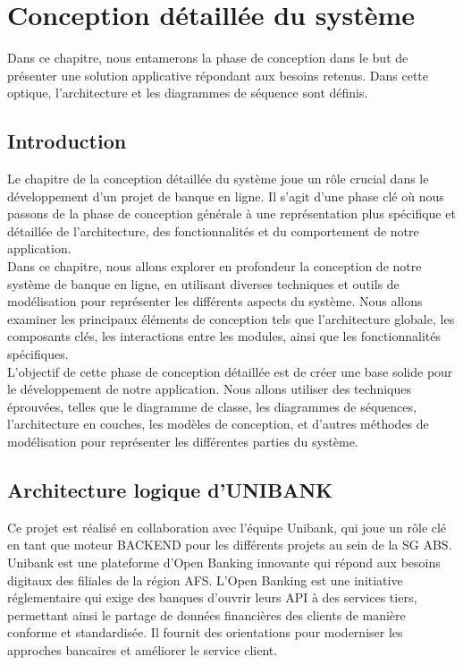 \chapter{Conception détaillée du système}
\par  Dans ce chapitre, nous entamerons la phase de conception dans le but de présenter une
solution applicative répondant aux besoins retenus. Dans cette optique, l'architecture et les diagrammes de séquence sont définis. 


\clearpage
\section{Introduction}
Le chapitre de la conception détaillée du système joue un rôle crucial dans le développement d'un projet de banque en ligne. Il s'agit d'une phase clé où nous passons de la phase de conception générale à une représentation plus spécifique et détaillée de l'architecture, des fonctionnalités et du comportement de notre application.\\

Dans ce chapitre, nous allons explorer en profondeur la conception de notre système de banque en ligne, en utilisant diverses techniques et outils de modélisation pour représenter les différents aspects du système. Nous allons examiner les principaux éléments de conception tels que l'architecture globale, les composants clés, les interactions entre les modules, ainsi que les fonctionnalités spécifiques.\\

L'objectif de cette phase de conception détaillée est de créer une base solide pour le développement de notre application. Nous allons utiliser des techniques éprouvées, telles que le diagramme de classe, les diagrammes de séquences, l'architecture en couches, les modèles de conception, et d'autres méthodes de modélisation pour représenter les différentes parties du système.

\section{Architecture logique d'UNIBANK}
Ce projet est réalisé en collaboration avec l'équipe Unibank, qui joue un rôle clé en tant que moteur BACKEND pour les différents projets au sein de la SG ABS. Unibank est une plateforme d'Open Banking innovante qui répond aux besoins digitaux des filiales de la région AFS. L'Open Banking est une initiative réglementaire qui exige des banques d'ouvrir leurs API à des services tiers, permettant ainsi le partage de données financières des clients de manière conforme et standardisée. Il fournit des orientations pour moderniser les approches bancaires et améliorer le service client.\\

